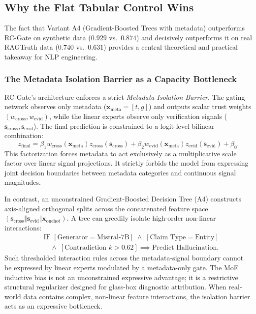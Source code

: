 \documentclass[pdflatex,sn-mathphys,Numbered]{sn-jnl}
\begin{document}
\subsection{Why the Flat Tabular Control Wins}\label{subsec:why_gbm_wins}

The fact that Variant A4 (Gradient-Boosted Trees with metadata) outperforms RC-Gate on synthetic data ($0.929$ vs.\ $0.874$) and decisively outperforms it on real RAGTruth data ($0.740$ vs.\ $0.631$) provides a central theoretical and practical takeaway for NLP engineering. 

\subsubsection{The Metadata Isolation Barrier as a Capacity Bottleneck}
RC-Gate's architecture enforces a strict \emph{Metadata Isolation Barrier}. The gating network observes only metadata ($\mathbf{x}_{\mathrm{meta}} = [t, g]$) and outputs scalar trust weights $(w_{\mathrm{cross}}, w_{\mathrm{evid}})$, while the linear experts observe only verification signals ($\mathbf{s}_{\mathrm{cross}}, \mathbf{s}_{\mathrm{evid}}$). The final prediction is constrained to a logit-level bilinear combination:
\begin{equation}
z_{\mathrm{final}} = \beta_1 w_{\mathrm{cross}}(\mathbf{x}_{\mathrm{meta}}) z_{\mathrm{cross}}(\mathbf{s}_{\mathrm{cross}}) + \beta_2 w_{\mathrm{evid}}(\mathbf{x}_{\mathrm{meta}}) z_{\mathrm{evid}}(\mathbf{s}_{\mathrm{evid}}) + \beta_0.
\end{equation}
This factorization forces metadata to act exclusively as a multiplicative scale factor over linear signal projections. It strictly forbids the model from expressing joint decision boundaries between metadata categories and continuous signal magnitudes. 

In contrast, an unconstrained Gradient-Boosted Decision Tree (A4) constructs axis-aligned orthogonal splits across the concatenated feature space $(\mathbf{s}_{\mathrm{cross}} \Vert \mathbf{s}_{\mathrm{evid}} \Vert \mathbf{x}_{\mathrm{onehot}})$. A tree can greedily isolate high-order non-linear interactions:
\begin{align*}
&\text{IF } [\text{Generator} = \text{Mistral-7B}] \;\land\; [\text{Claim Type} = \text{Entity}] \\
&\quad \land\; [\text{Contradiction } k > 0.62] \implies \text{Predict Hallucination}.
\end{align*}
Such thresholded interaction rules across the metadata-signal boundary cannot be expressed by linear experts modulated by a metadata-only gate. The MoE inductive bias is not an unconstrained expressive advantage; it is a restrictive structural regularizer designed for glass-box diagnostic attribution. When real-world data contains complex, non-linear feature interactions, the isolation barrier acts as an expressive bottleneck.
\end{document}
